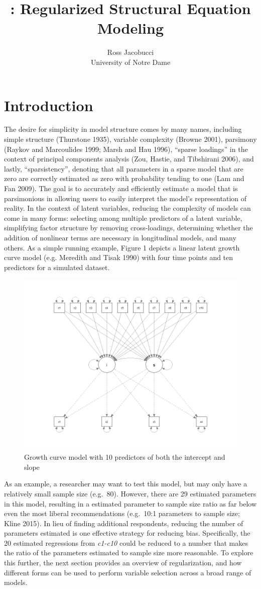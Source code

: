 \documentclass[article]{jss}
\author{
Ross Jacobucci\\University of Notre Dame
}
\title{\pkg{regsem}: Regularized Structural Equation Modeling}
\begin{document}
\setlength\parindent{24pt} \setlength{\parskip}{0.5em}

\section{Introduction}\label{introduction}

The desire for simplicity in model structure comes by many names,
including simple structure (Thurstone 1935), variable complexity (Browne
2001), parsimony (Raykov and Marcoulides 1999; Marsh and Hau 1996),
``sparse loadings'' in the context of principal components analysis
(Zou, Hastie, and Tibshirani 2006), and lastly, ``sparsistency'',
denoting that all parameters in a sparse model that are zero are
correctly estimated as zero with probability tending to one (Lam and Fan
2009). The goal is to accurately and efficiently estimate a model that
is parsimonious in allowing users to easily interpret the model's
representation of reality. In the context of latent variables, reducing
the complexity of models can come in many forms: selecting among
multiple predictors of a latent variable, simplifying factor structure
by removing cross-loadings, determining whether the addition of
nonlinear terms are necessary in longitudinal models, and many others.
As a simple running example, Figure 1 depicts a linear latent growth
curve model (e.g. Meredith and Tisak 1990) with four time points and ten
predictors for a simulated dataset.

\begin{figure}
    \centering
    \includegraphics[width=.5\linewidth]{figs/growth_fig}
    \caption{Growth curve model with 10 predictors of both the intercept and slope}
\end{figure}

As an example, a researcher may want to test this model, but may only
have a relatively small sample size (e.g.~80). However, there are 29
estimated parameters in this model, resulting in a estimated parameter
to sample size ratio as far below even the most liberal recommendations
(e.g.~10:1 parameters to sample size; Kline 2015). In lieu of finding
additional respondents, reducing the number of parameters estimated is
one effective strategy for reducing bias. Specifically, the 20 estimated
regressions from \textit{c1-c10} could be reduced to a number that makes
the ratio of the parameters estimated to sample size more reasonable. To
explore this further, the next section provides an overview of
regularization, and how different forms can be used to perform variable
selection across a broad range of models.
\end{document}
